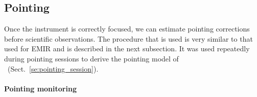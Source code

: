 \subsection{Pointing}
\label{se:pointing}

Once the instrument is correctly focused, we can estimate pointing corrections
before scientific observations. The procedure that is used is very similar to
that used for EMIR and is described in the next subsection. It was used
repeatedly during pointing sessions to derive the pointing model of
\nika\ (Sect.~\ref{se:pointing_session}).

\paragraph{Pointing monitoring}

